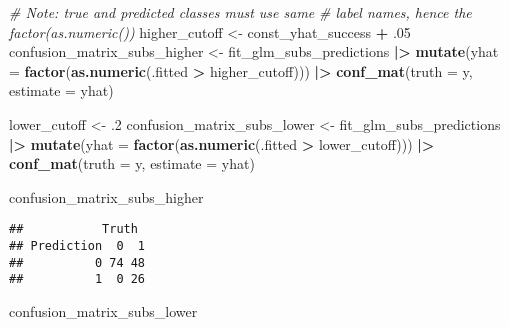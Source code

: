 \documentclass[
]{article}
\newenvironment{Shaded}{\begin{snugshade}}{\end{snugshade}}
\newcommand{\AttributeTok}[1]{\textcolor[rgb]{0.13,0.29,0.53}{#1}}
\newcommand{\CommentTok}[1]{\textcolor[rgb]{0.56,0.35,0.01}{\textit{#1}}}
\newcommand{\DecValTok}[1]{\textcolor[rgb]{0.00,0.00,0.81}{#1}}
\newcommand{\FunctionTok}[1]{\textcolor[rgb]{0.13,0.29,0.53}{\textbf{#1}}}
\newcommand{\NormalTok}[1]{#1}
\newcommand{\OtherTok}[1]{\textcolor[rgb]{0.56,0.35,0.01}{#1}}
\newcommand{\SpecialCharTok}[1]{\textcolor[rgb]{0.81,0.36,0.00}{\textbf{#1}}}
\begin{document}
\begin{Shaded}
\begin{Highlighting}[]
\CommentTok{\# Note: true and predicted classes must use same}
\CommentTok{\# label names, hence the factor(as.numeric()) }
\NormalTok{higher\_cutoff }\OtherTok{\textless{}{-}}\NormalTok{ const\_yhat\_success }\SpecialCharTok{+}\NormalTok{ .}\DecValTok{05}
\NormalTok{confusion\_matrix\_subs\_higher }\OtherTok{\textless{}{-}}
\NormalTok{  fit\_glm\_subs\_predictions }\SpecialCharTok{|\textgreater{}}
  \FunctionTok{mutate}\NormalTok{(}\AttributeTok{yhat =} \FunctionTok{factor}\NormalTok{(}\FunctionTok{as.numeric}\NormalTok{(.fitted }\SpecialCharTok{\textgreater{}}\NormalTok{ higher\_cutoff))) }\SpecialCharTok{|\textgreater{}}
  \FunctionTok{conf\_mat}\NormalTok{(}\AttributeTok{truth =}\NormalTok{ y, }\AttributeTok{estimate =}\NormalTok{ yhat)}
\end{Highlighting}
\end{Shaded}

\begin{Shaded}
\begin{Highlighting}[]
\NormalTok{lower\_cutoff }\OtherTok{\textless{}{-}}\NormalTok{ .}\DecValTok{2}
\NormalTok{confusion\_matrix\_subs\_lower }\OtherTok{\textless{}{-}}
\NormalTok{  fit\_glm\_subs\_predictions }\SpecialCharTok{|\textgreater{}}
  \FunctionTok{mutate}\NormalTok{(}\AttributeTok{yhat =} \FunctionTok{factor}\NormalTok{(}\FunctionTok{as.numeric}\NormalTok{(.fitted }\SpecialCharTok{\textgreater{}}\NormalTok{ lower\_cutoff))) }\SpecialCharTok{|\textgreater{}}
  \FunctionTok{conf\_mat}\NormalTok{(}\AttributeTok{truth =}\NormalTok{ y, }\AttributeTok{estimate =}\NormalTok{ yhat)}
\end{Highlighting}
\end{Shaded}

\begin{Shaded}
\begin{Highlighting}[]
\NormalTok{confusion\_matrix\_subs\_higher}
\end{Highlighting}
\end{Shaded}

\begin{verbatim}
##           Truth
## Prediction  0  1
##          0 74 48
##          1  0 26
\end{verbatim}

\begin{Shaded}
\begin{Highlighting}[]
\NormalTok{confusion\_matrix\_subs\_lower}
\end{Highlighting}
\end{Shaded}
\end{document}
